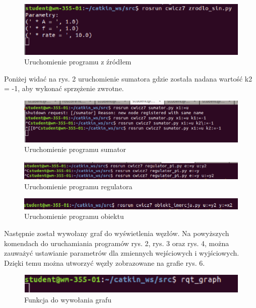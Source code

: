 \documentclass[10pt,a4paper,twoside,twocolumn]{article}%
\begin{document}
\begin{figure}[H]
    \centering
    \includegraphics[width=0.9\linewidth]{image1.png}
    \caption{Uruchomienie programu z źródłem}
\end{figure}

Poniżej widać na rys. 2 uruchomienie sumatora gdzie została nadana wartość k2 = -1, aby wykonać sprzężenie zwrotne.

\begin{figure}[H]
    \centering
    \includegraphics[width=0.9\linewidth]{image2.png}
    \caption{Uruchomienie programu sumator}
\end{figure}

\begin{figure}[H]
    \centering
    \includegraphics[width=0.9\linewidth]{image3.png}
    \caption{Uruchomienie programu regulatora}
\end{figure}

\begin{figure}[H]
    \centering
    \includegraphics[width=0.9\linewidth]{image4.png}
    \caption{Uruchomienie programu obiektu}
\end{figure}

Następnie został wywołany graf do wyświetlenia węzłów. Na powyższych komendach do uruchamiania programów rys. 2, rys. 3 oraz rys. 4, można zauważyć ustawianie parametrów dla zmiennych wejściowych i wyjściowych. Dzięki temu można utworzyć węzły zobrazowane na grafie rys. 6.

\begin{figure}[H]
    \centering
    \includegraphics[width=0.9\linewidth]{image5.png}
    \caption{Funkcja do wywołania grafu}
\end{figure}
\end{document}
